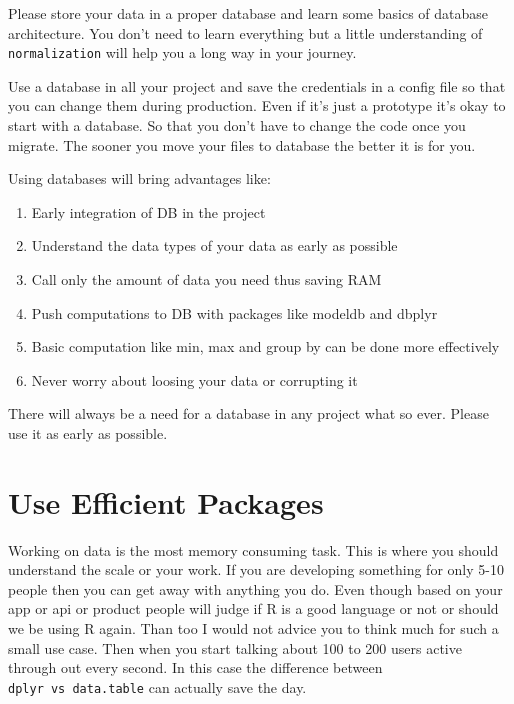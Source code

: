 \documentclass[
]{book}
\providecommand{\tightlist}{%
  \setlength{\itemsep}{0pt}\setlength{\parskip}{0pt}}
\begin{document}
Please store your data in a proper database and learn some basics of database architecture. You don't need to learn everything but a little understanding of \texttt{normalization} will help you a long way in your journey.

Use a database in all your project and save the credentials in a config file so that you can change them during production. Even if it's just a prototype it's okay to start with a database. So that you don't have to change the code once you migrate. The sooner you move your files to database the better it is for you.

Using databases will bring advantages like:

\begin{enumerate}
\def\labelenumi{\arabic{enumi}.}
\tightlist
\item
  Early integration of DB in the project
\item
  Understand the data types of your data as early as possible
\item
  Call only the amount of data you need thus saving RAM
\item
  Push computations to DB with packages like modeldb and dbplyr
\item
  Basic computation like min, max and group by can be done more effectively
\item
  Never worry about loosing your data or corrupting it
\end{enumerate}

There will always be a need for a database in any project what so ever. Please use it as early as possible.

\hypertarget{use-efficient-packages}{%
\section{Use Efficient Packages}\label{use-efficient-packages}}

Working on data is the most memory consuming task. This is where you should understand the scale or your work. If you are developing something for only 5-10 people then you can get away with anything you do. Even though based on your app or api or product people will judge if R is a good language or not or should we be using R again. Than too I would not advice you to think much for such a small use case. Then when you start talking about 100 to 200 users active through out every second. In this case the difference between \texttt{dplyr\ vs\ data.table} can actually save the day.
\end{document}
